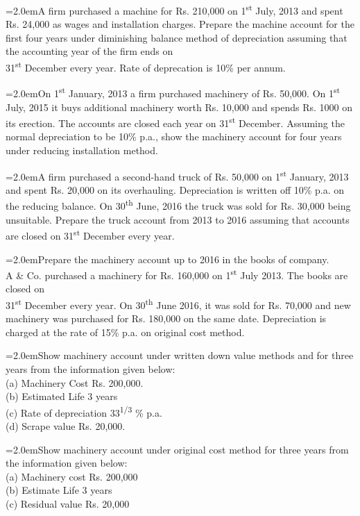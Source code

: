 \documentclass[11pt,a4paper]{article}
\newcommand{\lqn}[2]{\Needspace{6\baselineskip}\par\medskip\noindent\hangindent=2.0em\hangafter=1\makebox[2.0em][l]{\textbf{#1.}}#2\par}
\begin{document}
\lqn{67}{A firm purchased a machine for Rs. 210,000 on 1\textsuperscript{st}  July, 2013 and spent Rs. 24,000 as wages and installation charges. Prepare the machine account for the first four years under diminishing balance method of depreciation assuming that the accounting year of the firm ends on\\
31\textsuperscript{st}  December every year. Rate of deprecation is 10\% per annum.\par
}
\lqn{68}{On 1\textsuperscript{st}  January, 2013 a firm purchased machinery of Rs. 50,000. On 1\textsuperscript{st}  July, 2015 it buys additional machinery worth Rs. 10,000 and spends Rs. 1000 on its erection. The accounts are closed each year on 31\textsuperscript{st}  December. Assuming the normal depreciation to be 10\% p.a., show the machinery account for four years under reducing installation method.\par
}
\lqn{69}{A firm purchased a second-hand truck of Rs. 50,000 on 1\textsuperscript{st}  January, 2013 and spent Rs. 20,000 on its overhauling. Depreciation is written off 10\% p.a. on the reducing balance. On 30\textsuperscript{th}  June, 2016 the truck was sold for Rs. 30,000 being unsuitable. Prepare the truck account from 2013 to 2016 assuming that accounts are closed on 31\textsuperscript{st}  December every year.\par
}
\lqn{70}{Prepare the machinery account up to 2016 in the books of company.\\
A \& Co. purchased a machinery for Rs. 160,000 on 1\textsuperscript{st}  July 2013. The books are closed on\\
31\textsuperscript{st}  December every year. On 30\textsuperscript{th}  June 2016, it was sold for Rs. 70,000 and new machinery was purchased for Rs. 180,000 on the same date. Depreciation is charged at the rate of 15\% p.a. on original cost method.\par
}
\lqn{71}{Show machinery account under written down value methods and for three years from the information given below:\\
(a) Machinery Cost Rs. 200,000.\\
(b) Estimated Life 3 years\\
(c) Rate of depreciation 33\textsuperscript{1/3} \% p.a.\\
(d) Scrape value Rs. 20,000.\par
}
\lqn{72}{Show machinery account under original cost method for three years from the information given below:\\
(a) Machinery cost Rs. 200,000\\
(b) Estimate Life 3 years\\
(c) Residual value Rs. 20,000\par
}
\end{document}
